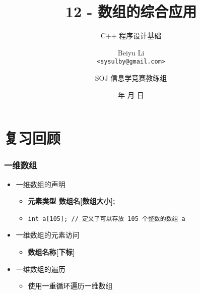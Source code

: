 \title[12 - 数组的综合应用]
{12 - 数组的综合应用}

\subtitle{C++ 程序设计基础}

\author[Beiyu Li]
{Beiyu Li\\
\texttt{<sysulby@gmail.com>}}


\date[\today]
{\number\year 年 \number\month 月 \number\day 日}




\author[sysulby]
{SOJ 信息学竞赛教练组}

\begin{frame}
    \titlepage
\end{frame}
\setcounter{framenumber}{0} %


\section{复习回顾}

\begin{frame}[fragile]
    \frametitle{一维数组}

    \begin{itemize}[<+->]
        \item 一维数组的声明
        
            \begin{itemize}
                \item \textbf{元素类型 \enspace 数组名[数组大小];}
                \item \lstinline|int a[105]; // 定义了可以存放 105 个整数的数组 a|
            \end{itemize}

        \item 一维数组的元素访问
        
            \begin{itemize}
                \item \textbf{数组名称[下标]}
            \end{itemize}

        \item 一维数组的遍历
        
            \begin{itemize}
                \item 使用一重循环遍历一维数组
            \end{itemize}

    \end{itemize}
\end{frame}

